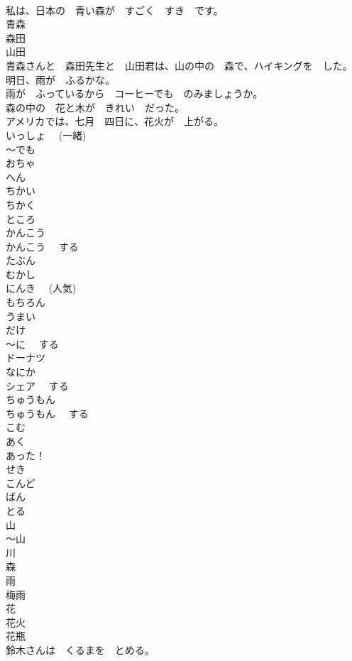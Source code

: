 \documentclass[8pt]{extreport}
\begin{document}
\begin{CJK}{UTF8}{min}
\\	私は、日本の　青い森が　すごく　すき　です。	
\\	青森	
\\	森田	
\\	山田	
\\	青森さんと　森田先生と　山田君は、山の中の　森で、ハイキングを　した。	
\\	明日、雨が　ふるかな。	
\\	雨が　ふっているから　コーヒーでも　のみましょうか。	
\\	森の中の　花と木が　きれい　だった。	
\\	アメリカでは、七月　四日に、花火が　上がる。	
\\	いっしょ　 (一緒)	
\\	～でも	
\\	おちゃ	
\\	へん	
\\	ちかい	
\\	ちかく	
\\	ところ	
\\	かんこう	
\\	かんこう　 する	
\\	たぶん	
\\	むかし	
\\	にんき　 (人気)	
\\	もちろん	
\\	うまい	
\\	だけ	
\\	～に　 する	
\\	ドーナツ	
\\	なにか	
\\	シェア　 する	
\\	ちゅうもん	
\\	ちゅうもん　 する	
\\	こむ	
\\	あく	
\\	あった！	
\\	せき	
\\	こんど	
\\	ばん	
\\	とる	
\\	山	
\\	～山	
\\	川	
\\	森	
\\	雨	
\\	梅雨	
\\	花	
\\	花火	
\\	花瓶	
\\	鈴木さんは　くるまを　とめる。	

\end{CJK}
\end{document}
